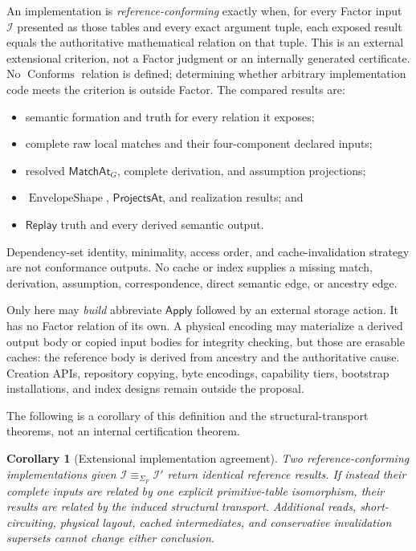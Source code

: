 \documentclass[11pt,twoside]{article}
\newcommand{\Apply}{\mathsf{Apply}}
\newcommand{\Replay}{\mathsf{Replay}}
\newcommand{\MatchAt}{\mathsf{MatchAt}}
\newcommand{\ProjectsAt}{\mathsf{ProjectsAt}}
\newtheorem{corollary}[theorem]{Corollary}
\begin{document}
An implementation is \emph{reference-conforming} exactly when, for every Factor
input \(\mathcal I\) presented as those tables and every exact argument tuple,
each exposed result equals the authoritative mathematical relation on that tuple.  This is an
external extensional criterion, not a Factor judgment or an internally generated
certificate.  No \(\operatorname{Conforms}\) relation is defined; determining
whether arbitrary implementation code meets the criterion is outside Factor.  The
compared results are:

\begin{itemize}[leftmargin=2em]
  \item semantic formation and truth for every relation it exposes;
  \item complete raw local matches and their four-component declared inputs;
  \item resolved \(\MatchAt_G\), complete derivation, and assumption projections;
  \item \(\operatorname{EnvelopeShape}\), \(\ProjectsAt\), and realization
        results; and
  \item \(\Replay\) truth and every derived semantic output.
\end{itemize}

Dependency-set identity, minimality, access order, and cache-invalidation strategy
are not conformance outputs.  No cache or index supplies a missing match,
derivation, assumption, correspondence, direct semantic edge, or ancestry edge.

Only here may \emph{build} abbreviate \(\Apply\) followed by an external storage
action.  It has no Factor relation of its own.  A physical encoding may materialize
a derived output body or copied input bodies for integrity checking, but those are
erasable caches: the reference body is derived from ancestry and the authoritative
cause.  Creation APIs, repository copying, byte encodings, capability tiers,
bootstrap installations, and index designs remain outside the proposal.

The following is a corollary of this definition and the structural-transport
theorems, not an internal certification theorem.

\begin{corollary}[Extensional implementation agreement]\label{thm:conformance}
Two reference-conforming implementations given
\(\mathcal I\equiv_{\Sigma_F}\mathcal I'\) return identical reference results.
If instead their complete inputs are related by one explicit primitive-table isomorphism,
their results are related by the induced structural transport.  Additional reads,
short-circuiting, physical layout, cached intermediates, and conservative
invalidation supersets cannot change either conclusion.
\end{corollary}
\end{document}
